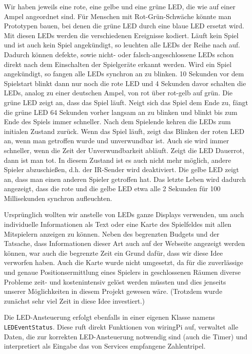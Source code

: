 Wir haben jeweils eine rote, eine gelbe und eine grüne LED, die wie auf einer Ampel angeordnet sind.
Für Menschen mit Rot-Grün-Schwäche könnte man Prototypen bauen, bei denen die grüne LED durch eine
blaue LED ersetzt wird.
Mit diesen LEDs werden die verschiedenen Ereignisse kodiert.
Läuft kein Spiel und ist auch kein Spiel angekündigt, so leuchten alle LEDs der Reihe nach auf.
Dadurch können defekte, sowie nicht- oder falsch-angeschlossene LEDs schon direkt nach dem
Einschalten der Spielgeräte erkannt werden.
Wird ein Spiel angekündigt, so fangen alle LEDs synchron an zu blinken.
10 Sekunden vor dem Spielstart blinkt dann nur noch die rote LED und 4 Sekunden davor schalten die
LEDs, analog zu einer deutschen Ampel, von rot über rot-gelb auf grün.
Die grüne LED zeigt an, dass das Spiel läuft.
Neigt sich das Spiel dem Ende zu, fängt die grüne LED 64 Sekunden vorher langsam an zu blinken und
blinkt bis zum Ende des Spiels immer schneller.
Nach dem Spielende kehren die LEDs zum initialen Zustand zurück.
Wenn das Spiel läuft, zeigt das Blinken der roten LED an, wenn man getroffen wurde und unverwundbar
ist.
Auch sie wird immer schneller, wenn die Zeit der Unverwundbarkeit abläuft.
Zeigt die LED Dauerrot, dann ist man tot.
In diesem Zustand ist es auch nicht mehr möglich, andere Spieler abzuschießen, d.h. der IR-Sender
wird deaktiviert.
Die gelbe LED zeigt an, dass man einen anderen Spieler getroffen hat.
Das letzte Leben wird dadurch angezeigt, dass die rote und die gelbe LED etwa alle 2 Sekunden für
100 Millisekunden synchron aufleuchten.

Ursprünglich wollten wir anstelle von LEDs ganze Displays verwenden, um auch individuelle
Informationen als Text oder eine Karte des Spielfeldes mit allen Mitspielern anzeigen zu können.
Neben des begrenzten Budgets und der Tatsache, dass Informationen dieser Art auch auf der Webseite
angezeigt werden können, war auch die begrenzte Zeit ein Grund dafür, dass wir diese Idee verworfen
haben.
Auch die Karte wurde nicht umgesetzt, da für die zuverlässige und genaue Positionsermittlung eines
Spielers in geschlossenen Räumen diverse Probleme zeit- und kostenintensiv gelöst werden müssten und
dies jenseits unserer Möglichkeiten in diesem Projekt gewesen wäre.
(Trotzdem wurde zunächst sehr viel Zeit in diese Idee investiert.)

Die LED-Ansteuerung erfolgt ebenfalls in einer eigenen Klasse namens \texttt{LEDEventStatus}.
Diese ruft direkt Funktionen von wiringPi auf, verwaltet alle Daten, die zur korrekten
LED-Ansteuerung notwendig sind (auch die Timer) und interpretiert als Eingabe das von Services
empfangene Zahlentripel.

